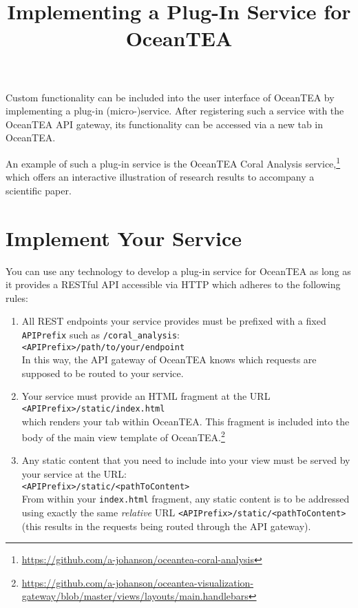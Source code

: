 \documentclass[11pt,a4paper,english,oneside,parskip=false]{scrartcl} %
\begin{document}
\title{Implementing a Plug\hyp{}In Service for OceanTEA}
\date{}

\maketitle

Custom functionality can be included into the user interface of OceanTEA by implementing a plug\hyp{}in (micro-)service. 
After registering such a service with the OceanTEA API gateway, its functionality can be accessed via a new tab in OceanTEA. 

An example of such a plug\hyp{}in service is the OceanTEA Coral Analysis service,\footnote{\url{https://github.com/a-johanson/oceantea-coral-analysis}} which offers an interactive illustration of research results to accompany a scientific paper.

\section{Implement Your Service}

You can use any technology to develop a plug\hyp{}in service for OceanTEA as long as it provides a RESTful API accessible via HTTP which adheres to the following rules: 
\begin{enumerate}
	\item All REST endpoints your service provides must be prefixed with a fixed \texttt{APIPrefix} such as \texttt{/coral\_analysis}:\\
	\texttt{<APIPrefix>/path/to/your/endpoint}\\
	In this way, the API gateway of OceanTEA knows which requests are supposed to be routed to your service. 
	\item Your service must provide an HTML fragment at the URL\\
	\texttt{<APIPrefix>/static/index.html}\\
	which renders your tab within OceanTEA. 
	This fragment is included into the body of the main view template of OceanTEA.\footnote{\url{https://github.com/a-johanson/oceantea-visualization-gateway/blob/master/views/layouts/main.handlebars}}
	\item Any static content that you need to include into your view must be served by your service at the URL:\\
	\texttt{<APIPrefix>/static/<pathToContent>}\\
	From within your \texttt{index.html} fragment, any static content is to be addressed using exactly the same \emph{relative} URL \texttt{<APIPrefix>/static/<pathToContent>} (this results in the requests being routed through the API gateway). 
\end{enumerate}
\end{document}
